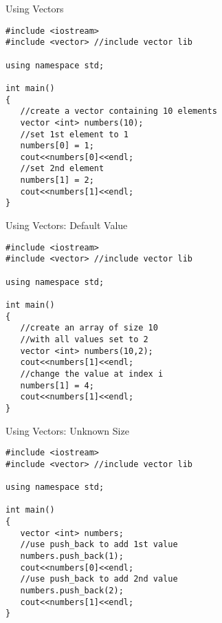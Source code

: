 \documentclass[xcolor={dvipsnames}]{beamer}
\begin{document}
\begin{frame}[fragile]{Using Vectors}
\begin{verbatim}
#include <iostream>
#include <vector> //include vector lib

using namespace std;

int main()
{
   //create a vector containing 10 elements
   vector <int> numbers(10);
   //set 1st element to 1
   numbers[0] = 1;
   cout<<numbers[0]<<endl;
   //set 2nd element
   numbers[1] = 2;
   cout<<numbers[1]<<endl;
}
\end{verbatim}
\end{frame}

\begin{frame}[fragile]{Using Vectors: Default Value}
\begin{verbatim}
#include <iostream>
#include <vector> //include vector lib

using namespace std;

int main()
{
   //create an array of size 10 
   //with all values set to 2
   vector <int> numbers(10,2);
   cout<<numbers[1]<<endl;
   //change the value at index i
   numbers[1] = 4;
   cout<<numbers[1]<<endl;
}
\end{verbatim}
\end{frame}
\begin{frame}[fragile]{Using Vectors: Unknown Size}
\begin{verbatim}
#include <iostream>
#include <vector> //include vector lib

using namespace std;

int main()
{
   vector <int> numbers;
   //use push_back to add 1st value
   numbers.push_back(1);
   cout<<numbers[0]<<endl;
   //use push_back to add 2nd value
   numbers.push_back(2);
   cout<<numbers[1]<<endl;
}
\end{verbatim}
\end{frame}
\end{document}
